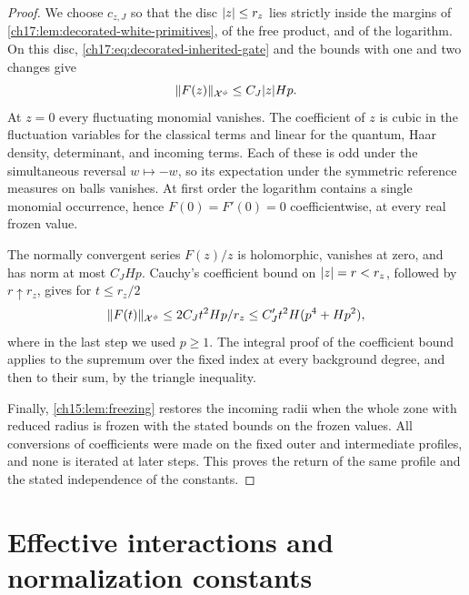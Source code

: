 \begin{proof}
We choose $c_{z,J}$ so that the disc $\lvert z\rvert\le r_z$ lies strictly inside the margins of \cref{ch17:lem:decorated-white-primitives}, of the free product, and of the logarithm. On this disc, \eqref{ch17:eq:decorated-inherited-gate} and the bounds with one and two changes give
\[
 \lVert F(z)\rVert_{\mathcal X^\phi}\le C_J\lvert z\rvert Hp.
\]
At $z=0$ every fluctuating monomial vanishes. The coefficient of $z$ is cubic in the fluctuation variables for the classical terms and linear for the quantum, Haar density, determinant, and incoming terms. Each of these is odd under the simultaneous reversal $w\mapsto-w$, so its expectation under the symmetric reference measures on balls vanishes. At first order the logarithm contains a single monomial occurrence, hence $F(0)=F'(0)=0$ coefficientwise, at every real frozen value.

The normally convergent series $F(z)/z$ is holomorphic, vanishes at zero, and has norm at most $C_JHp$. Cauchy's coefficient bound on $\lvert z\rvert=r<r_z$, followed by $r\uparrow r_z$, gives for $t\le r_z/2$
\[
 \lVert F(t)\rVert_{\mathcal X^\phi}\le2C_Jt^2Hp/r_z\le C_J't^2H(p^4+Hp^2),
\]
where in the last step we used $p\ge1$. The integral proof of the coefficient bound applies to the supremum over the fixed index at every background degree, and then to their sum, by the triangle inequality.

Finally, \cref{ch15:lem:freezing} restores the incoming radii when the whole zone with reduced radius is frozen with the stated bounds on the frozen values. All conversions of coefficients were made on the fixed outer and intermediate profiles, and none is iterated at later steps. This proves the return of the same profile and the stated independence of the constants.
\end{proof}

\section{Effective interactions and normalization constants}\label{ch17:sec:normalization}

